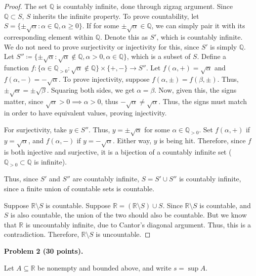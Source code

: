\documentclass[11pt]{article}
\begin{document}
\begin{proof}
    The set $\mathbb{Q}$ is countably infinite, done through zigzag argument. Since $\mathbb{Q} \subset S$, $S$ inherits the infinite property. To prove countability, let $S = \{\pm \sqrt{\alpha}: \alpha \in \mathbb{Q}, \alpha \geq 0\}$. If for some $\pm \sqrt{\alpha} \in \mathbb{Q}$, we can simply pair it with its corresponding element within $\mathbb{Q}$. Denote this as $S'$, which is countably infinite. We do not need to prove surjectivity or injectivity for this, since $S'$ is simply $\mathbb{Q}$. Let $S'' \coloneq \{ \pm \sqrt{\alpha}: \sqrt{\alpha} \not \in \mathbb{Q}, \alpha > 0, \alpha \in \mathbb{Q} \}$, which is a subset of $S$. Define a function $f: \{\alpha \in \mathbb{Q}_{>0}: \sqrt{\alpha} \not \in \mathbb{Q}\} \times \{+,-\} \rightarrow S''$. Let $f(\alpha, +) = \sqrt{\alpha}$ and $f(\alpha, -) = -\sqrt{\alpha}$. To prove injectivity, suppose $f(\alpha, \pm) = f(\beta, \pm)$. Thus, $\pm \sqrt{\alpha} = \pm \sqrt{\beta}$. Squaring both sides, we get $\alpha = \beta$. Now, given this, the signs matter, since $\sqrt{\alpha} > 0 \implies \alpha > 0$, thus $-\sqrt{\alpha} \neq \sqrt{\alpha}$. Thus, the signs must match in order to have equivalent values, proving injectivity. 

    For surjectivity, take $y \in S''$. Thus, $y = \pm \sqrt{\alpha}$ for some $\alpha \in \mathbb{Q}_{>0}$. Set $f(\alpha, +)$ if $y = \sqrt{\alpha}$, and $f(\alpha, -)$ if $y = -\sqrt{\alpha}$. Either way, $y$ is being hit. Therefore, since $f$ is both injective and surjective, it is a bijection of a countably infinite set ($\mathbb{Q}_{>0} \subset \mathbb{Q}$ is infinite). 

    Thus, since $S'$ and $S''$ are countably infinite, $S = S' \cup S''$ is countably infinite, since a finite union of countable sets is countable.

    Suppose $\mathbb{R} \setminus S$ is countable. Suppose $\mathbb{R} = (\mathbb{R} \setminus S) \cup S$. Since $\mathbb{R} \setminus S$ is countable, and $S$ is also countable, the union of the two should also be countable. But we know that $\mathbb{R}$ is uncountably infinite, due to Cantor's diagonal argument. Thus, this is a contradiction. Therefore, $\mathbb{R} \setminus S$ is uncountable. 
\end{proof}

\bigskip

\noindent\textbf{Problem 2 (30 points).}

\noindent Let $A \subseteq \mathbb{R}$ be nonempty and bounded above, and write $s = \sup A$.
\end{document}
